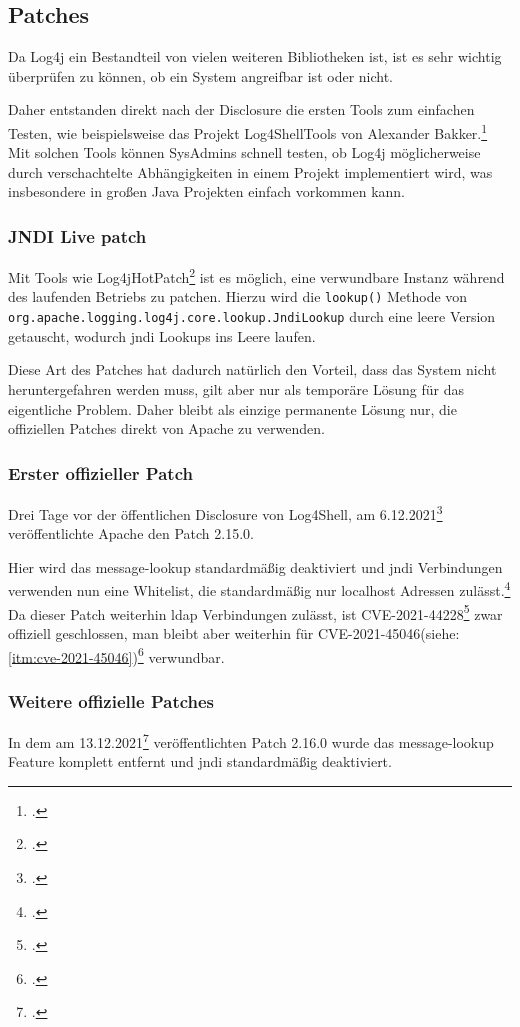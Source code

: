 
\subsection{Patches}\label{subsec:patches}
Da Log4j ein Bestandteil von vielen weiteren Bibliotheken ist, ist es sehr wichtig überprüfen zu können, ob ein System angreifbar ist oder nicht.

Daher entstanden direkt nach der Disclosure die ersten Tools zum einfachen Testen, wie beispielsweise das Projekt Log4ShellTools von Alexander Bakker.\footcite{log4ShellTools}
Mit solchen Tools können SysAdmins schnell testen, ob Log4j möglicherweise durch verschachtelte Abhängigkeiten in einem Projekt implementiert wird, was insbesondere in großen Java Projekten einfach vorkommen kann.

\subsubsection{JNDI Live patch}
Mit Tools wie Log4jHotPatch\footcite{hotpatch} ist es möglich, eine verwundbare Instanz während des laufenden Betriebs zu patchen.
Hierzu wird die \verb|lookup()| Methode von \verb|org.apache.logging.log4j.core.lookup.JndiLookup| durch eine leere Version getauscht, wodurch \gls{jndi} Lookups ins Leere laufen.

Diese Art des Patches hat dadurch natürlich den Vorteil, dass das System nicht heruntergefahren werden muss, gilt aber nur als temporäre Lösung für das eigentliche Problem.
Daher bleibt als einzige permanente Lösung nur, die offiziellen Patches direkt von Apache zu verwenden.

\subsubsection{Erster offizieller Patch}
Drei Tage vor der öffentlichen Disclosure von Log4Shell, am 6.12.2021\footcite{log4jChange} veröffentlichte Apache den Patch 2.15.0.

Hier wird das message-lookup standardmäßig deaktiviert und \gls{jndi} Verbindungen verwenden nun eine Whitelist, die standardmäßig nur localhost Adressen zulässt.\footcite{log4jSecurity}
Da dieser Patch weiterhin \gls{ldap} Verbindungen zulässt, ist CVE-2021-44228\footcite{44228} zwar offiziell geschlossen, man bleibt aber weiterhin für CVE-2021-45046(siehe: \ref{itm:cve-2021-45046})\footcite{45046} verwundbar.

\subsubsection{Weitere offizielle Patches}
In dem am 13.12.2021\footcite{log4jChange} veröffentlichten Patch 2.16.0 wurde das message-lookup Feature komplett entfernt und \gls{jndi} standardmäßig deaktiviert.

